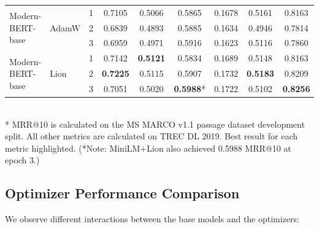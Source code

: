 \documentclass[conference]{IEEEtran}
\begin{document}
\begin{table}[htbp]
\begin{tabular}{l l c c c c c c c}
\midrule
\multirow{3}{*}{Modern-BERT-base} & \multirow{3}{*}{AdamW}
    & 1 & 0.7105 & 0.5066 & 0.5865 & 0.1678 & 0.5161 & 0.8163 \\
    & & 2 & 0.6839 & 0.4893 & 0.5885 & 0.1634 & 0.4946 & 0.7814 \\
    & & 3 & 0.6959 & 0.4971 & 0.5916 & 0.1623 & 0.5116 & 0.7860 \\ %
\midrule
\multirow{3}{*}{Modern-BERT-base} & \multirow{3}{*}{Lion}
    & 1 & 0.7142 & \cellcolor{yellow!50}\textbf{0.5121} & 0.5834 & 0.1689 & 0.5148 & 0.8163 \\
    & & 2 & \cellcolor{yellow!50}\textbf{0.7225} & 0.5115 & 0.5907 & 0.1732 & \cellcolor{yellow!50}\textbf{0.5183} & 0.8209 \\
    & & 3 & 0.7051 & 0.5020 & \cellcolor{yellow!50}\textbf{0.5988}* & 0.1722 & 0.5102 & \cellcolor{yellow!50}\textbf{0.8256} \\
\bottomrule
\end{tabular}
\vspace{1em}\\
\footnotesize{* MRR@10 is calculated on the MS MARCO v1.1 passage dataset development split. All other metrics are calculated on TREC DL 2019. Best result for each metric highlighted. (*Note: MiniLM+Lion also achieved 0.5988 MRR@10 at epoch 3.)}
\end{table}

\subsection{Optimizer Performance Comparison}
We observe different interactions between the base models and the optimizers:
\end{document}
